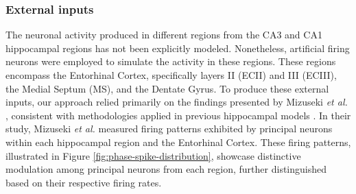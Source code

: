 \documentclass[../main.tex]{subfiles}
\begin{document}
\subsubsection{External inputs}
The neuronal activity produced in different regions from the CA3 and CA1 hippocampal regions has not been explicitly modeled.
Nonetheless, artificial firing neurons were employed to simulate the activity in these regions. These regions encompass the Entorhinal Cortex, specifically layers II (ECII) and III (ECIII), the Medial Septum (MS), and the Dentate Gyrus.
To produce these external inputs, our approach relied primarily on the findings presented by Mizuseki \textit{et al.} \citep{mizuseki_theta_2009}, consistent with methodologies applied in previous hippocampal models \citep{cutsuridis_computational_2015}.
In their study, Mizuseki \textit{et al.} measured firing patterns exhibited by principal neurons within each hippocampal region and the Entorhinal Cortex.
These firing patterns, illustrated in Figure \ref{fig:phase-spike-distribution}, showcase distinctive modulation among principal neurons from each region, further distinguished based on their respective firing rates.
\end{document}
